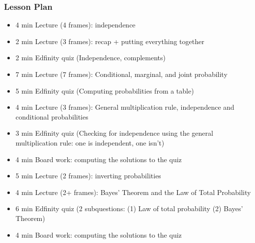 \begin{frame}
    \frametitle{Lesson Plan}
    \begin{itemize}
        \item 4 min Lecture (4 frames): independence
        \item 2 min Lecture (3 frames): recap + putting everything together

        \item 2 min Edfinity quiz (Independence, complements)
        \item 7 min Lecture (7 frames): Conditional, marginal, and joint probability
        \item 5 min Edfinity quiz (Computing probabilities from a table)
        \item 4 min Lecture (3 frames): General multiplication rule, independence and conditional probabilities
        \item 3 min Edfinity quiz (Checking for independence using the general multiplication rule: one is independent, one isn't)
        \item 4 min Board work: computing the solutions to the quiz
        
        \item 5 min Lecture (2 frames): inverting probabilities
        \item 4 min Lecture (2+ frames): Bayes' Theorem and the Law of Total Probability
        \item 6 min Edfinity quiz (2 subquestions: (1) Law of total probability (2) Bayes' Theorem)
        \item 4 min Board work: computing the solutions to the quiz
    \end{itemize}
\end{frame}


